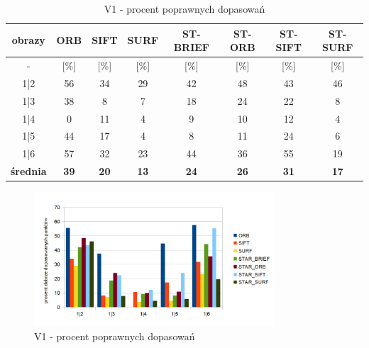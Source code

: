 \begin{table}[htbp]
  \centering
  \caption{V1 - procent poprawnych dopasowań}
    \begin{tabular}{|c|c|c|c|c|c|c|c|}\hline
    obrazy & \textbf{ORB} & \textbf{SIFT} & \textbf{SURF} & \textbf{ST-BRIEF} & \textbf{ST-ORB} & \textbf{ST-SIFT} & \textbf{ST-SURF} \\\hline
     - & [\%] & [\%] & [\%] & [\%] & [\%] & [\%] & [\%] \\\hline
    1|2 & 56 & 34 & 29 & 42 & 48 & 43 & 46 \\
    1|3 & 38 & 8 & 7 & 18 & 24 & 22 & 8 \\
    1|4 & 0 & 11 & 4 & 9 & 10 & 12 & 4 \\
    1|5 & 44 & 17 & 4 & 8 & 11 & 24 & 6 \\
    1|6 & 57 & 32 & 23 & 44 & 36 & 55 & 19 \\\hline
    \textbf{średnia} & \textbf{39} & \textbf{20} & \textbf{13} & \textbf{24} & \textbf{26} & \textbf{31} & \textbf{17} \\\hline
   
    \end{tabular}%
  \label{tab:v1_m2}%
\end{table}%


\begin{figure}
\centering
\includegraphics[width=0.8\textwidth]{pict/slowik/v1/m2.png}
\caption{V1 - procent poprawnych dopasowań}
\label{fig:v1_m2}
\end{figure}




\FloatBarrier
\newpage
